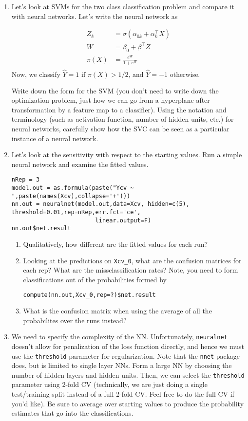 \documentclass[11pt]{article}
\begin{document}
\begin{enumerate}
\item Let's look at SVMs for the two class classification problem and compare it with neural networks.  Let's write the neural network as

\begin{align*}
Z_k & = \sigma(\alpha_{0k} + \alpha_k^{\top}X) \\
W    & = \beta_0 + \beta^{\top}Z \\
\pi(X) & = \frac{e^W}{1 + e^W} \\
\end{align*}
Now, we classify $\hat{Y} = 1$ if $\pi(X) > 1/2$, and $\hat{Y} = -1$ otherwise.

Write down the form for the SVM (you don't need to write down the optimization problem, just how we can go from a 
hyperplane after transformation by a feature map to a classifier). Using the notation and terminology (such as activation function, number of hidden units, etc.) for neural networks, carefully show how the SVC can be seen as a particular instance of a neural network. 

\item Let's look at the sensitivity with respect to the starting values.  Run a simple neural network
and examine the fitted values.

\begin{verbatim}
nRep = 3
model.out = as.formula(paste("Ycv ~ ",paste(names(Xcv),collapse='+')))
nn.out = neuralnet(model.out,data=Xcv, hidden=c(5), threshold=0.01,rep=nRep,err.fct='ce',
                        linear.output=F)
nn.out$net.result
\end{verbatim}
\begin{enumerate}
\item Qualitatively, how different are the fitted values for each run?
\item Looking at the predictions on {\tt Xcv\_0}, what are the confusion matrices for each rep? What are the missclassification rates?  Note, you need to form classifications out of the probabilities formed by
\begin{verbatim}
compute(nn.out,Xcv_0,rep=?)$net.result
\end{verbatim}
\item What is the confusion matrix when using the average of all the probabilites over the runs instead?
\end{enumerate}

\item We need to specify the complexity of the NN.  Unfortunately, {\tt neuralnet} doesn't allow for
penalization of the loss function directly, and hence we must use the {\tt threshold} parameter for
regularization.  Note that the {\tt nnet} package does, but is limited to single layer NNs.  Form a large
NN by choosing the number of hidden layers and hidden units.  Then, we can select the {\tt threshold}
parameter using 2-fold CV (technically, we are just doing a single test/training split instead
of a full 2-fold CV.  Feel free to do the full CV if you'd like).  Be sure to average over starting values to produce the probability estimates
that go into the classifications.  


\end{enumerate}
\end{document}

